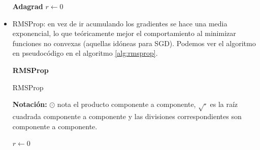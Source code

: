\begin{itemize}
\begin{algorithm}[]{\Large{\textbf{Adagrad}}}
		$r\leftarrow 0$
		
		
		\vspace{10px}
		
		
		\vspace{5px}
	\end{algorithm}

	\item RMSProp: en vez de ir acumulando los gradientes se hace una media exponencial, lo que teóricamente mejor el comportamiento al minimizar funciones no convexas (aquellas idóneas para SGD). Podemos ver el algoritmo en pseudocódigo en el algoritmo \ref{alg:rmsprop}.
	
	\begin{algorithm}[]{\Large{\textbf{RMSProp}}}
		
		\vspace{15px}
		
		\caption{RMSProp}
		\label{alg:rmsprop}
		\textbf{Notación:} $\odot$ nota el producto componente a componente, $\sqrt{\cdot}$ es la raíz cuadrada componente a componente y las divisiones correspondientes son componente a componente.
		
		
		\vspace{10px}
		
		$r\leftarrow 0$
		
\end{algorithm}
\end{itemize}
